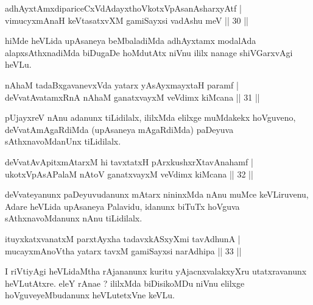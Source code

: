 
\begin{shl}
adhAyxtAmxdipariceCxVdAdayxthoVkotxVpAsanAsharxyAtf |\\
vimucyxmAnaH keVtasatxvXM gamiSayxsi vadA\s \s shu meV \hfill || 30 || 
\end{shl}

\begin{artha}
hiMde heVLida upAsaneya beMbaladiMda adhAyxtamx modalAda alapxsAthxnadiMda biDugaDe hoMdutAtx niVnu ililx nanage shiVGarxvAgi heVLu.
\end{artha}


\begin{shl}
nAhaM tadaBxgavanevxVda yatarx yAsAyxmayxtaH paramf |\\
deVvatAvatamxRnA nAhaM ganatxvayxM veVdimx kiMcana \hfill || 31 || 
\end{shl}

\begin{artha}
pUjayxreV nAnu adanunx tiLidilalx, ililxMda elilxge muMdakekx hoVguveno, deVvatAmAgaRdiMda (upAsaneya mAgaRdiMda) paDeyuva sAthxnavoMdanUnx tiLidilalx.
\end{artha}

\begin{shl}
deVvatAvApitxmAtarxM hi tavxtatxH pArxkushxrXtavAnahamf |\\
ukotxVpAsAPalaM nAtoV ganatxvayxM veVdimx kiMcana \hfill || 32 || 
\end{shl}

\begin{artha}
deVvateyanunx paDeyuvudanunx mAtarx nininxMda nAnu muMce keVLiruvenu, Adare heVLida upAsaneya Palavidu, idanunx biTuTx hoVguva sAthxnavoMdanunx nAnu tiLidilalx.
\end{artha}


\begin{shl}
ituyxkatxvanatxM parxtAyxha tadavxkASxyXmi tavAdhunA |\\
mucayxmAnoV\s tha yatarx tavxM gamiSayxsi narAdhipa \hfill || 33 || 
\end{shl}

\begin{artha}
I riVtiyAgi heVLidaMtha rAjananunx kuritu yAjacnxvalakxyXru utatxravanunx heVLutAtxre. eleY rAnae ? ililxMda biDisikoMDu niVnu elilxge hoVguveyeMbudanunx heVLutetxVne keVLu.
\end{artha}

